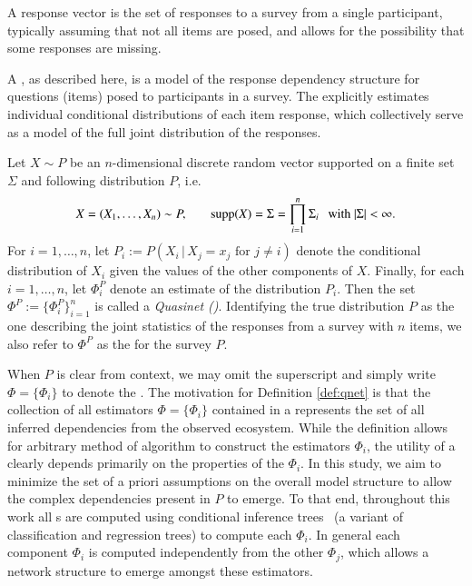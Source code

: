 \documentclass[onecolumn,10pt]{IEEEtran}
\begin{document}
\begin{defn}
  A response vector is the set of responses to a survey from a single participant, typically assuming that not all items are posed, and allows for the possibility that some responses are missing.
\end{defn}

A \qnet, as described here, is a model of the response dependency  structure for questions (items) posed to participants in a survey.  The \qnet explicitly estimates individual conditional distributions of each item response, which collectively serve as a model of the full joint distribution of the responses. 

\begin{defn}[\qnet]
  \label{def:qnet}
  Let $X \sim P$ be an $n$-dimensional discrete random vector supported on a finite set $\Sigma$ and following distribution $P$, i.e. \[X = (X_1, \ldots, X_n) \sim P, \hspace{0.25in} \operatorname{supp}(X) =  \Sigma = \displaystyle\prod_{i=1}^n \Sigma_i \hspace{.1in} \text{with } |\Sigma| < \infty.\] For $i = 1, \ldots, n$, let $P_i := P(X_i\,|\,X_j=x_j \text{ for } j \neq i)$ denote the conditional distribution of $X_i$ given the values of the other components of $X$.  Finally, for each $i = 1, \ldots, n$, let $\Phi^P_i$ denote an estimate of the distribution $P_i$.  Then the set $\Phi^P := \{\Phi^P_i\}_{i=1}^n$ is called a \emph{Quasinet (\qnet)}. Identifying the true distribution $P$ as the one describing the joint statistics of the responses from a survey with $n$ items, we also refer to  $\Phi^P$ as the \qnet for the survey $P$.
\end{defn}

When $P$ is clear from context, we may omit the superscript and simply write $\Phi = \{\Phi_i\}$ to denote the \qnet. The motivation for Definition \ref{def:qnet} is that the collection of all estimators $\Phi = \{ \Phi_i \}$ contained in a \qnet represents the set of all inferred dependencies from the observed ecosystem.  While the definition allows for arbitrary method of algorithm to construct the estimators $\Phi_i$, the utility of a \qnet clearly depends primarily on the properties of the $\Phi_i$.  In this study, we aim to minimize the set of a priori assumptions on the overall model structure to allow the complex dependencies present in $P$ to emerge. To that end, throughout this work all {\qnet}s are computed using conditional inference trees~\cite{sarda2017conditional} (a variant of classification and regression trees) to compute each $\Phi_i$. In general each \qnet component $\Phi_i$ is computed independently from the other $\Phi_j$, which allows a network structure to emerge amongst these estimators.
\end{document}
